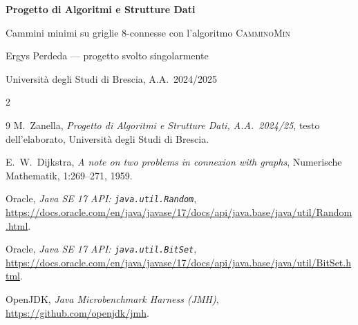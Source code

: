 \documentclass[11pt,a4paper]{article}
\newcommand{\cmin}{\textsc{CamminoMin}}
\newcommand{\code}[1]{\texttt{#1}}
\begin{document}
\begin{center}
  {\LARGE\bfseries Progetto di Algoritmi e Strutture Dati\par}
  \vspace{4pt}
  {\large Cammini minimi su griglie 8-connesse con l'algoritmo \cmin\par}
  \vspace{10pt}
  {\normalsize Ergys Perdeda --- progetto svolto singolarmente\par}
  \vspace{2pt}
  {\small Università degli Studi di Brescia, A.A.\ 2024/2025\par}
\end{center}
\vspace{6pt}

\begin{multicols}{2}
\small{}
\tableofcontents
\end{multicols}
\clearpage

\clearpage
\clearpage
\clearpage
\clearpage
\clearpage
\clearpage
\clearpage

\appendix


\vspace*{\fill}
\begin{thebibliography}{9}
M.~Zanella, \emph{Progetto di Algoritmi e Strutture Dati, A.A.\ 2024/25}, testo dell'elaborato, Università degli Studi di Brescia.

E.~W.~Dijkstra, \emph{A note on two problems in connexion with graphs}, Numerische Mathematik, 1:269--271, 1959.

Oracle, \emph{Java SE 17 API: \code{java.util.Random}},
\url{https://docs.oracle.com/en/java/javase/17/docs/api/java.base/java/util/Random.html}.

Oracle, \emph{Java SE 17 API: \code{java.util.BitSet}},
\url{https://docs.oracle.com/en/java/javase/17/docs/api/java.base/java/util/BitSet.html}.

OpenJDK, \emph{Java Microbenchmark Harness (JMH)},
\url{https://github.com/openjdk/jmh}.
\end{thebibliography}
\end{document}
